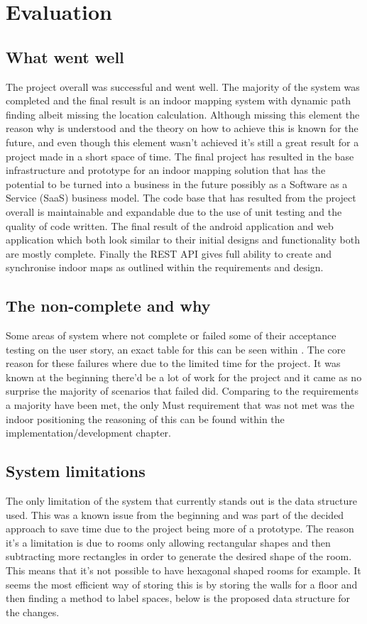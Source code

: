 \section{Evaluation}
\subsection{What went well} %
The project overall was successful and went well. The majority of the system was completed and the final result is an indoor mapping system with dynamic path finding albeit missing the location calculation. Although missing this element the reason why is understood and the theory on how to achieve this is known for the future, and even though this element wasn't achieved it's still a great result for a project made in a short space of time. The final project has resulted in the base infrastructure and prototype for an indoor mapping solution that has the potential to be turned into a business in the future possibly as a Software as a Service (SaaS) business model. The code base that has resulted from the project overall is maintainable and expandable due to the use of unit testing and the quality of code written. The final result of the android application and web application which both look similar to their initial designs and functionality both are mostly complete. Finally the REST API gives full ability to create and synchronise indoor maps as outlined within the requirements and design.

\subsection{The non-complete and why}
Some areas of system where not complete or failed some of their acceptance testing on the user story, an exact table for this can be seen within \appendixtemp. The core reason for these failures where due to the limited time for the project. It was known at the beginning there'd be a lot of work for the project and it came as no surprise the majority of scenarios that failed did. Comparing to the requirements a majority have been met, the only Must requirement that was not met was the indoor positioning the reasoning of this can be found within the implementation/development chapter.

\subsection{System limitations}
The only limitation of the system that currently stands out is the data structure used. This was a known issue from the beginning and was part of the decided approach to save time due to the project being more of a prototype. The reason it's a limitation is due to rooms only allowing rectangular shapes and then subtracting more rectangles in order to generate the desired shape of the room. This means that it's not possible to have hexagonal shaped rooms for example. It seems the most efficient way of storing this is by storing the walls for a floor and then finding a method to label spaces, below is the proposed data structure for the changes.

